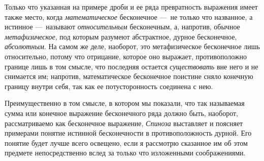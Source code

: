 Только что указанная на примере дроби и ее ряда превратность выражения имеет
также место, когда {\em математическое} бесконечное
—~не только что названное, а истинное —~называют
{\em относительным} бесконечным, а, напротив, обычное
{\em метафизическое}, под которым разумеют абстрактное,
дурное бесконечное, {\em абсолютным}. На самом же деле,
наоборот, это метафизическое бесконечное лишь относительно, потому что
отрицание, которое оно выражает, противоположно границе лишь в том смысле,
что последняя остается {\em существовать} вне него и не
снимается им; напротив, математическое бесконечное поистине сняло конечную
границу внутри себя, так как ее потусторонность соединена с нею.

Преимущественно в том смысле, в котором мы показали, что так называемая
сумма или конечное выражение бесконечного ряда должно быть, наоборот,
рассматриваемо как бесконечное выражение, {\em Спиноза}
выставляет и поясняет примерами понятие истинной бесконечности в
противоположность дурной. Его понятие будет лучше всего освещено, если я
рассмотрю сказанное им об этом предмете непосредственно вслед за только что
изложенными соображениями.

